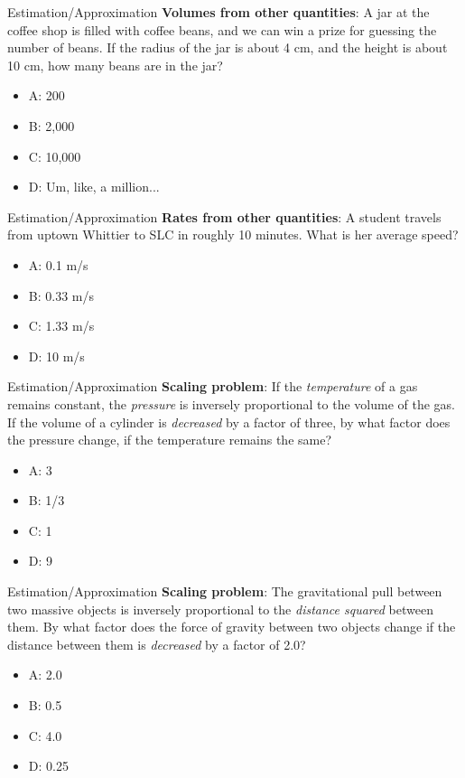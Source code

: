 \documentclass{beamer}
\begin{document}
\begin{frame}{Estimation/Approximation}
\textbf{Volumes from other quantities}: A jar at the coffee shop is filled with coffee beans, and we can win a prize for guessing the number of beans.  If the radius of the jar is about 4 cm, and the height is about 10 cm, how many beans are in the jar?
\vspace{0.55cm}
\begin{itemize}
\item A: 200
\item B: 2,000
\item C: 10,000
\item D: Um, like, a million...
\end{itemize}
\end{frame}

\begin{frame}{Estimation/Approximation}
\textbf{Rates from other quantities}: A student travels from uptown Whittier to SLC in roughly 10 minutes.  What is her average speed?
\begin{itemize}
\item A: 0.1 m/s
\item B: 0.33 m/s
\item C: 1.33 m/s
\item D: 10 m/s
\end{itemize}
\end{frame}

\begin{frame}{Estimation/Approximation}
\textbf{Scaling problem}: If the \textit{temperature} of a gas remains constant, the \textit{pressure} is inversely proportional to the volume of the gas.  If the volume of a cylinder is \textit{decreased} by a factor of three, by what factor does the pressure change, if the temperature remains the same?
\begin{itemize}
\item A: 3
\item B: 1/3
\item C: 1
\item D: 9
\end{itemize}
\end{frame}

\begin{frame}{Estimation/Approximation}
\textbf{Scaling problem}: The gravitational pull between two massive objects is inversely proportional to the \textit{distance squared} between them.  By what factor does the force of gravity between two objects change if the distance between them is \textit{decreased} by a factor of 2.0?
\begin{itemize}
\item A: 2.0
\item B: 0.5
\item C: 4.0
\item D: 0.25
\end{itemize}
\end{frame}
\end{document}
